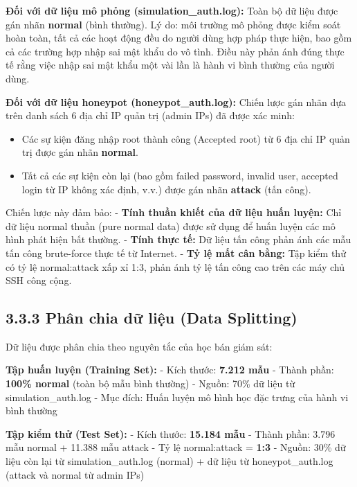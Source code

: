 \documentclass[
  a4paper]{report}
\providecommand{\tightlist}{%
  \setlength{\itemsep}{0pt}\setlength{\parskip}{0pt}}
\begin{document}
\textbf{Đối với dữ liệu mô phỏng (simulation\_auth.log):} Toàn bộ dữ
liệu được gán nhãn \textbf{normal} (bình thường). Lý do: môi trường mô
phỏng được kiểm soát hoàn toàn, tất cả các hoạt động đều do người dùng
hợp pháp thực hiện, bao gồm cả các trường hợp nhập sai mật khẩu do vô
tình. Điều này phản ánh đúng thực tế rằng việc nhập sai mật khẩu một vài
lần là hành vi bình thường của người dùng.

\textbf{Đối với dữ liệu honeypot (honeypot\_auth.log):} Chiến lược gán
nhãn dựa trên danh sách 6 địa chỉ IP quản trị (admin IPs) đã được xác
minh:

\begin{itemize}
\tightlist
\item
  Các sự kiện đăng nhập root thành công (Accepted root) từ 6 địa chỉ IP
  quản trị được gán nhãn \textbf{normal}.
\item
  Tất cả các sự kiện còn lại (bao gồm failed password, invalid user,
  accepted login từ IP không xác định, v.v.) được gán nhãn
  \textbf{attack} (tấn công).
\end{itemize}

Chiến lược này đảm bảo: - \textbf{Tính thuần khiết của dữ liệu huấn
luyện:} Chỉ dữ liệu normal thuần (pure normal data) được sử dụng để huấn
luyện các mô hình phát hiện bất thường. - \textbf{Tính thực tế:} Dữ liệu
tấn công phản ánh các mẫu tấn công brute-force thực tế từ Internet. -
\textbf{Tỷ lệ mất cân bằng:} Tập kiểm thử có tỷ lệ normal:attack xấp xỉ
1:3, phản ánh tỷ lệ tấn công cao trên các máy chủ SSH công cộng.

\subsection{3.3.3 Phân chia dữ liệu (Data
Splitting)}\label{phuxe2n-chia-dux1eef-liux1ec7u-data-splitting}

Dữ liệu được phân chia theo nguyên tắc của học bán giám sát:

\textbf{Tập huấn luyện (Training Set):} - Kích thước: \textbf{7.212 mẫu}
- Thành phần: \textbf{100\% normal} (toàn bộ mẫu bình thường) - Nguồn:
70\% dữ liệu từ simulation\_auth.log - Mục đích: Huấn luyện mô hình học
đặc trưng của hành vi bình thường

\textbf{Tập kiểm thử (Test Set):} - Kích thước: \textbf{15.184 mẫu} -
Thành phần: 3.796 mẫu normal + 11.388 mẫu attack - Tỷ lệ normal:attack =
\textbf{1:3} - Nguồn: 30\% dữ liệu còn lại từ simulation\_auth.log
(normal) + dữ liệu từ honeypot\_auth.log (attack và normal từ admin IPs)
\end{document}
